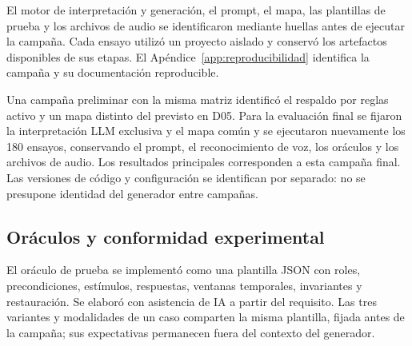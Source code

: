 \documentclass[a4paper,fleqn]{cas-dc}
\begin{document}
El motor de interpretación y generación, el prompt, el mapa, las plantillas de prueba y los archivos de audio se identificaron mediante huellas antes de ejecutar la campaña. Cada ensayo utilizó un proyecto aislado y conservó los artefactos disponibles de sus etapas. El Apéndice~\ref{app:reproducibilidad} identifica la campaña y su documentación reproducible.

Una campaña preliminar con la misma matriz identificó el respaldo por reglas activo y un mapa distinto del previsto en D05. Para la evaluación final se fijaron la interpretación LLM exclusiva y el mapa común y se ejecutaron nuevamente los 180 ensayos, conservando el prompt, el reconocimiento de voz, los oráculos y los archivos de audio. Los resultados principales corresponden a esta campaña final. Las versiones de código y configuración se identifican por separado: no se presupone identidad del generador entre campañas.

\subsection{Oráculos y conformidad experimental}
\label{sec:oraculos}
El oráculo de prueba se implementó como una plantilla JSON con roles, precondiciones, estímulos, respuestas, ventanas temporales, invariantes y restauración. Se elaboró con asistencia de IA a partir del requisito. Las tres variantes y modalidades de un caso comparten la misma plantilla, fijada antes de la campaña; sus expectativas permanecen fuera del contexto del generador.
\end{document}
